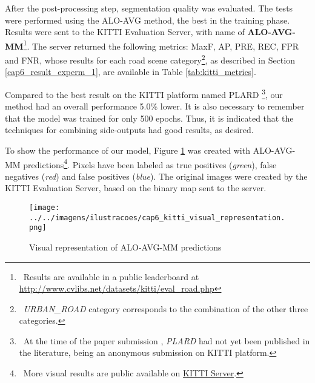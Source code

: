 After the post-processing step, segmentation quality was evaluated.
The tests were performed using the ALO-AVG method, the best in the training phase.
Results were sent to  the KITTI Evaluation Server, with name of \textbf{ALO-AVG-MM}\footnote{~Results are available in a public leaderboard at \url{http://www.cvlibs.net/datasets/kitti/eval_road.php}}.
The server returned the following metrics: MaxF, AP, PRE, REC, FPR and FNR, whose results for each road scene category\footnote{~\textit{URBAN\_ROAD} category corresponds to the combination of the other three categories.}, as described in Section \ref{cap6_result_experm_1}, are available in Table \ref{tab:kitti_metrics}.



Compared to the best result on the KITTI platform named PLARD \cite{Chen:2019}\footnote{~At the time of the paper submission \cite{Reis:2019}, \textit{PLARD} had not yet been published in the literature, being an anonymous submission on KITTI platform.}, our method had an overall performance 5.0\% lower.
It is also necessary to remember that the model was trained for only 500 epochs.
Thus, it is indicated that the techniques for combining side-outputs had good results, as desired.

To show the performance of our model, Figure \ref{fig:kitti_representacao_visual} was created with ALO-AVG-MM predictions\footnote{~More visual results are public available on \href{http://www.cvlibs.net/datasets/kitti/eval_road_detail.php?result=a5ca173550cb383caf3e12ca236d7c809489d2d9}{KITTI Server}.}.
Pixels have been labeled as true positives (\textit{green}), false negatives (\textit{red}) and false positives (\textit{blue}).
The original images were created by the KITTI Evaluation Server, based on the binary map sent to the server.

\begin{figure}
  \centering
  \caption{Visual representation of ALO-AVG-MM predictions}
  \texttt{[image: ../../imagens/ilustracoes/cap6\_kitti\_visual\_representation.png]}
  \sourceOwn
  \label{fig:kitti_representacao_visual}
\end{figure}

